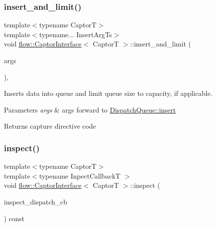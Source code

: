 \subsubsection{\texorpdfstring{insert\+\_\+and\+\_\+limit()}{insert\_and\_limit()}}
{\footnotesize\ttfamily template$<$typename CaptorT$>$ \\
template$<$typename... Insert\+Arg\+Ts$>$ \\
void \hyperlink{classflow_1_1_captor_interface}{flow\+::\+Captor\+Interface}$<$ CaptorT $>$\+::insert\+\_\+and\+\_\+limit (\begin{DoxyParamCaption}\item[{Insert\+Arg\+Ts \&\&...}]{args }\end{DoxyParamCaption})\hspace{0.3cm}{\ttfamily [inline]}, {\ttfamily [protected]}}



Inserts data into queue and limit queue size to capacity, if applicable. 


\begin{DoxyParams}{Parameters}
{\em args} & args forward to {\ttfamily \hyperlink{classflow_1_1_dispatch_queue_a5221c73d3790e6795c48229a2bcd7c0e}{Dispatch\+Queue\+::insert}}\\
\hline
\end{DoxyParams}
\begin{DoxyReturn}{Returns}
capture directive code 
\end{DoxyReturn}
\mbox{\label{classflow_1_1_captor_interface_a4648d1a3ec30a603e24e9ba0a667159d}} 
\subsubsection{\texorpdfstring{inspect()}{inspect()}}
{\footnotesize\ttfamily template$<$typename CaptorT$>$ \\
template$<$typename Inpect\+CallbackT $>$ \\
void \hyperlink{classflow_1_1_captor_interface}{flow\+::\+Captor\+Interface}$<$ CaptorT $>$\+::inspect (\begin{DoxyParamCaption}\item[{Inpect\+CallbackT \&\&}]{inspect\+\_\+dispatch\+\_\+cb }\end{DoxyParamCaption}) const\hspace{0.3cm}{\ttfamily [inline]}}




